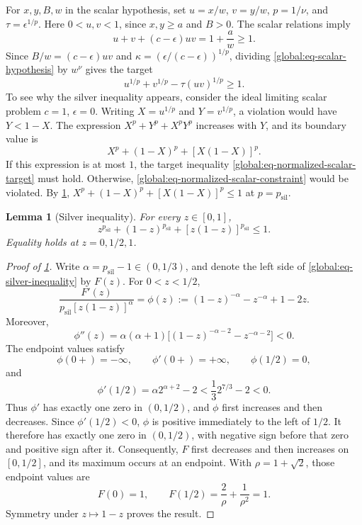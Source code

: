 \documentclass[11pt,letterpaper]{article}
\newtheorem{lemma}[lemma]{Lemma}
\theoremstyle{definition}
\newcommand{\psil}{p_{\mathrm{sil}}}
\begin{document}
For $x,y,B,w$ in the scalar hypothesis, set $u=x/w$, $v=y/w$, $p=1/\nu$, and $\tau=\epsilon^{1/p}$.
Here $0<u,v<1$, since $x,y\ge a$ and $B>0$.
The scalar relations imply
\begin{equation}
  u+v+(c-\epsilon) uv=1+\frac aw\ge1.
  \label{global:eq-normalized-scalar-constraint}
\end{equation}
Since $B/w=(c-\epsilon) uv$ and $\kappa=(\epsilon/(c-\epsilon))^{1/p}$, dividing \eqref{global:eq-scalar-hypothesis} by $w^\nu$ gives the target
\begin{equation}
  u^{1/p}+v^{1/p}-\tau(uv)^{1/p}\ge1.
  \label{global:eq-normalized-scalar-target}
\end{equation}
To see why the silver inequality appears, consider the ideal limiting scalar problem $c=1$, $\epsilon=0$.
Writing $X=u^{1/p}$ and $Y=v^{1/p}$, a violation would have $Y<1-X$.
The expression $X^p+Y^p+X^pY^p$ increases with $Y$, and its boundary value is
\[
  X^p+(1-X)^p+[X(1-X)]^p.
\]
If this expression is at most $1$, the target inequality \eqref{global:eq-normalized-scalar-target} must hold. Otherwise, \eqref{global:eq-normalized-scalar-constraint} would be violated.
By \cref{global:lem-silver-inequality}, $X^p+(1-X)^p+[X(1-X)]^p\le1$ at $p=\psil$.

\begin{lemma}[Silver inequality]
\label{global:lem-silver-inequality}
For every \(z\in[0,1]\),
\begin{equation*}
 z^{\psil}+(1-z)^{\psil}+[z(1-z)]^{\psil}\le 1.
\end{equation*}
Equality holds at \(z=0,1/2,1\).
\end{lemma}

\begin{proof}[Proof of \cref{global:lem-silver-inequality}]
Write $\alpha=\psil-1\in(0,1/3)$, and denote the left side of \eqref{global:eq-silver-inequality} by $F(z)$.
For $0<z<1/2$,
\[
  \frac{F'(z)}{\psil[z(1-z)]^\alpha}
  =\phi(z):=(1-z)^{-\alpha}-z^{-\alpha}+1-2z.
\]
Moreover,
\[
  \phi''(z)=\alpha(\alpha+1)
  \bigl[(1-z)^{-\alpha-2}-z^{-\alpha-2}\bigr]<0.
\]
The endpoint values satisfy
\[
  \phi(0+)=-\infty,\qquad \phi'(0+)=+\infty,\qquad
  \phi(1/2)=0,
\]
and
\[
  \phi'(1/2)=\alpha 2^{\alpha+2}-2
  <\frac13 2^{7/3}-2<0.
\]
Thus $\phi'$ has exactly one zero in $(0,1/2)$, and $\phi$ first increases and then decreases.
Since $\phi'(1/2)<0$, $\phi$ is positive immediately to the left of $1/2$.
It therefore has exactly one zero in $(0,1/2)$, with negative sign before that zero and positive sign after it.
Consequently, $F$ first decreases and then increases on $[0,1/2]$, and its maximum occurs at an endpoint.
With $\rho=1+\sqrt2$, those endpoint values are
\[
  F(0)=1,\qquad F(1/2)=\frac2\rho+\frac1{\rho^2}=1.
\]
Symmetry under $z\mapsto1-z$ proves the result.
\end{proof}
\end{document}
